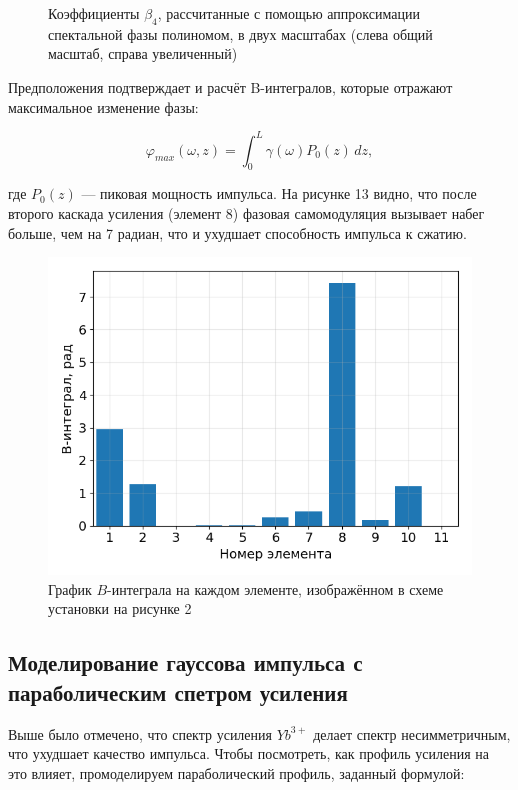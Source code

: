 \documentclass[12pt]{article}
\begin{document}
\begin{figure}[h!]
    \caption{Коэффициенты $\beta_4$, рассчитанные с помощью аппроксимации спектальной фазы полиномом,
     в двух масштабах (слева общий масштаб, справа увеличенный)}
    \label{fig:both}
\end{figure}

Предположения подтверждает и расчёт B-интегралов, которые отражают максимальное изменение фазы:

\begin{equation}
    \varphi_{max}(\omega, z) = \int_0^L \gamma(\omega) P_0(z)\,dz,
\end{equation}

где $P_0(z)$ — пиковая мощность импульса. На рисунке 13 видно, что после второго каскада усиления (элемент 8) фазовая
самомодуляция вызывает набег больше, чем на 7 радиан, что и ухудшает способность импульса к сжатию.

\begin{figure}[h!]
    \centering
    \begin{minipage}[b]{0.5\textwidth}
        \includegraphics[width=\textwidth]{Images/Gauss Pulse/!B интегралы}
    \end{minipage}
    \caption{График $B$-интеграла на каждом элементе, изображённом в схеме установки на рисунке 2}
\end{figure}

\subsection{Моделирование гауссова импульса с параболическим спетром усиления}

Выше было отмечено, что спектр усиления $Yb^{3+}$ делает спектр несимметричным, что ухудшает качество импульса.
Чтобы посмотреть, как профиль усиления на это влияет, промоделируем параболический профиль, заданный формулой:
\end{document}
